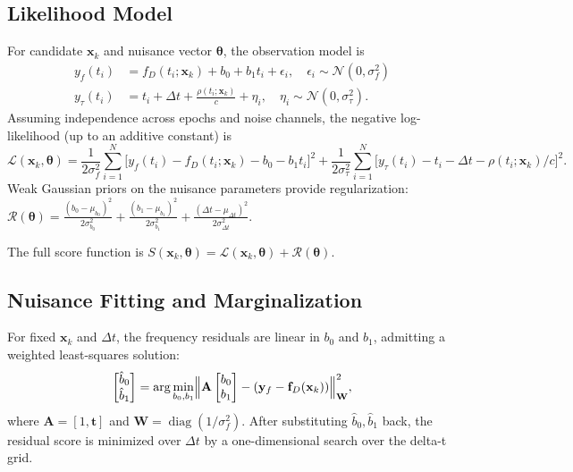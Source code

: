 \subsection{Likelihood Model}
For candidate $\mathbf{x}_k$ and nuisance vector $\boldsymbol{\theta}$, the
observation model is
\begin{subequations}
\begin{align}
  y_f(t_i) &= f_D(t_i; \mathbf{x}_k) + b_0 + b_1 t_i + \epsilon_i,
             \quad \epsilon_i \sim \mathcal{N}(0, \sigma_f^2) \\
  y_\tau(t_i) &= t_i + \Delta t + \frac{\rho(t_i; \mathbf{x}_k)}{c} + \eta_i,
                \quad \eta_i \sim \mathcal{N}(0, \sigma_\tau^2) .
\end{align}
\end{subequations}
Assuming independence across epochs and noise channels, the negative log-likelihood
(up to an additive constant) is
\begin{equation}
  \mathcal{L}(\mathbf{x}_k, \boldsymbol{\theta})
  = \frac{1}{2\sigma_f^2}\sum_{i=1}^{N}
      \bigl[y_f(t_i) - f_D(t_i; \mathbf{x}_k) - b_0 - b_1 t_i\bigr]^2
  + \frac{1}{2\sigma_\tau^2}\sum_{i=1}^{N}
      \bigl[y_\tau(t_i) - t_i - \Delta t - \rho(t_i; \mathbf{x}_k)/c\bigr]^2 .
  \label{eq:negloglik}
\end{equation}
Weak Gaussian priors on the nuisance parameters provide regularization:
$\mathcal{R}(\boldsymbol{\theta}) =
 \frac{(b_0-\mu_{b_0})^2}{2\sigma_{b_0}^2}
+\frac{(b_1-\mu_{b_1})^2}{2\sigma_{b_1}^2}
+\frac{(\Delta t-\mu_{\Delta t})^2}{2\sigma_{\Delta t}^2}$.

The full score function is $S(\mathbf{x}_k, \boldsymbol{\theta})
   = \mathcal{L}(\mathbf{x}_k, \boldsymbol{\theta}) + \mathcal{R}(\boldsymbol{\theta})$.

\subsection{Nuisance Fitting and Marginalization}
For fixed $\mathbf{x}_k$ and $\Delta t$, the frequency residuals are linear in
$b_0$ and $b_1$, admitting a weighted least-squares solution:
\begin{equation}
  \begin{bmatrix} \hat{b}_0 \\ \hat{b}_1 \end{bmatrix}
  = \arg\min_{b_0,b_1}
    \Bigl\|\mathbf{A}\begin{bmatrix}b_0\\b_1\end{bmatrix}
    - (\mathbf{y}_f - \mathbf{f}_D(\mathbf{x}_k))\Bigr\|_{\mathbf{W}}^2 ,
\end{equation}
where $\mathbf{A} = [1, \mathbf{t}]$ and $\mathbf{W} = \operatorname{diag}(1/\sigma_f^2)$.
After substituting $\hat{b}_0, \hat{b}_1$ back, the residual score is minimized
over $\Delta t$ by a one-dimensional search over the delta-t grid.

